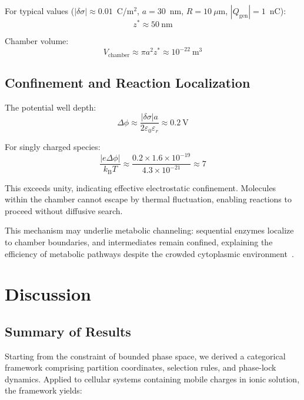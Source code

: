 \documentclass[twocolumn,aps,prb,superscriptaddress,longbibliography,floatfix]{revtex4-2}
\theoremstyle{remark}
\newcommand{\kB}{k_\text{B}}
\newcommand{\Qgen}{Q_\text{gen}}
\begin{document}
For typical values ($|\delta\sigma| \approx 0.01$~C/m$^2$, $a = 30$~nm,
$R = 10~\mu$m, $|\Qgen| = 1$~nC):
\begin{equation}
z^* \approx 50~\text{nm}
\end{equation}

Chamber volume:
\begin{equation}
V_\text{chamber} \approx \pi a^2 z^* \approx 10^{-22}~\text{m}^3
\end{equation}

\subsection{Confinement and Reaction Localization}

The potential well depth:
\begin{equation}
\Delta\phi \approx \frac{|\delta\sigma| a}{2\varepsilon_0\varepsilon_r} \approx 0.2~\text{V}
\end{equation}

For singly charged species:
\begin{equation}
\frac{|e\Delta\phi|}{\kB T} \approx \frac{0.2 \times 1.6 \times 10^{-19}}{4.3 \times 10^{-21}} \approx 7
\end{equation}

This exceeds unity, indicating effective electrostatic confinement.
Molecules within the chamber cannot escape by thermal fluctuation,
enabling reactions to proceed without diffusive search.

This mechanism may underlie metabolic channeling: sequential enzymes
localize to chamber boundaries, and intermediates remain confined,
explaining the efficiency of metabolic pathways despite the crowded
cytoplasmic environment~\cite{Srere1987}.

\section{Discussion}
\label{sec:discussion}

\subsection{Summary of Results}

Starting from the constraint of bounded phase space, we derived a
categorical framework comprising partition coordinates, selection rules,
and phase-lock dynamics. Applied to cellular systems containing mobile
charges in ionic solution, the framework yields:
\end{document}
